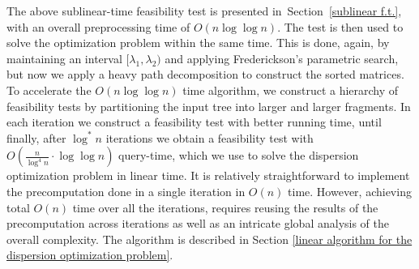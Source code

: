 \documentclass[11pt,a4paper]{article}
\theoremstyle{definition}
\theoremstyle{remark}
\begin{document}
The above sublinear-time feasibility test is presented in~Section~\ref{sublinear f.t.}, with an overall preprocessing time of $O(n\log\log n)$.
The test is then used to solve the optimization problem within the same time. This is done, again, by maintaining an interval
$[\lambda_{1},\lambda_{2})$ and applying Frederickson's parametric search, but now we apply a heavy path decomposition to construct
the sorted matrices.
To accelerate the $O(n\log\log n)$ time algorithm, we construct a hierarchy of feasibility tests by partitioning the input tree
into larger and larger fragments. In each iteration we construct a feasibility test with better running time, until finally, after $\log ^*n$ iterations
we obtain a feasibility test with $O(\frac{n}{\log ^4n} \cdot \log \log n)$ query-time, which we use to solve the dispersion optimization problem in linear  time. It is relatively straightforward to implement the precomputation done in a single iteration in $O(n)$ time. However, achieving total $O(n)$ time over all the iterations, requires reusing the results of the precomputation across iterations as well as an intricate global analysis of the overall complexity.
The algorithm is described in Section \ref{linear algorithm for the dispersion optimization problem}.
\end{document}
